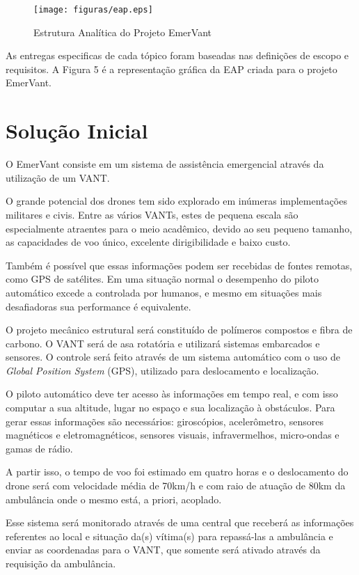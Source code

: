 \begin{figure}[ht]
  \centering
    \texttt{[image: figuras/eap.eps]}
  \caption{Estrutura Analítica do Projeto EmerVant}
\end{figure}

As entregas especificas de cada tópico foram baseadas nas definições de escopo e requisitos. A Figura 5 é a representação gráfica da EAP criada para o projeto EmerVant.

\section{Solução Inicial}
O EmerVant consiste em um sistema de assistência emergencial através da utilização de um VANT.  

O grande potencial dos drones tem sido explorado em inúmeras implementações militares e civis. Entre as vários VANTs, estes de pequena escala são especialmente atraentes para o meio acadêmico, devido ao seu pequeno tamanho, as capacidades de voo único, excelente dirigibilidade e baixo custo.\cite{SDM}

Também é possível que essas informações podem ser recebidas de fontes remotas, como GPS de satélites. Em uma situação normal o desempenho do piloto automático excede a controlada por humanos, e mesmo em situações mais desafiadoras sua performance é equivalente.

O projeto mecânico estrutural será constituído de polímeros compostos e fibra de carbono. O VANT será de asa rotatória e utilizará sistemas embarcados e sensores. O controle será feito através de um sistema automático com o uso de \textit{Global Position System} (GPS), utilizado para deslocamento e localização. 

O piloto automático deve ter acesso às informações em tempo real, e com isso computar a sua altitude, lugar no espaço e sua localização à obstáculos. Para gerar essas informações são necessários: giroscópios, acelerômetro, sensores magnéticos e eletromagnéticos, sensores visuais, infravermelhos, micro-ondas e gamas de rádio.\cite{UDE}

A partir isso, o tempo de voo foi estimado em quatro horas e o deslocamento do drone será com velocidade média de 70km/h e com raio de atuação de 80km da ambulância onde o mesmo está, a priori, acoplado. 

Esse sistema será monitorado através de uma central que receberá as informações referentes ao local e situação da(s) vítima(s) para repassá-las a ambulância e enviar as coordenadas para o VANT, que somente será ativado através da requisição da ambulância. 

